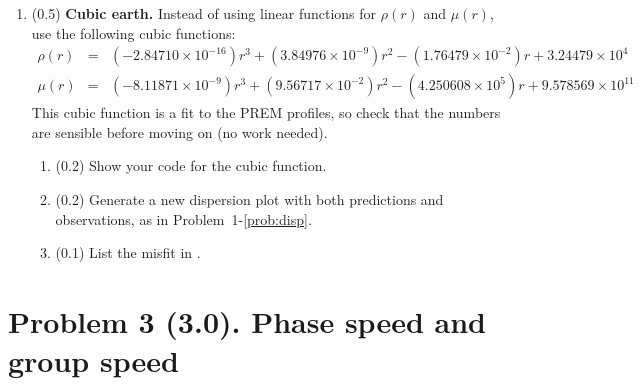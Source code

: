 \documentclass[11pt,titlepage,fleqn]{article}
\begin{document}
\begin{enumerate}
\item (0.5) {\bf Cubic earth.} Instead of using linear functions for $\rho(r)$ and $\mu(r)$, use the following cubic functions:
%
\begin{eqnarray*}
\rho(r) &=& (-2.84710 \times 10^{-16})r^3 + (3.84976 \times 10^{-9})r^2 - (1.76479 \times 10^{-2})r + 3.24479 \times 10^{4}
\\
\mu(r) &=& (-8.11871 \times 10^{-9}) r^3 + (9.56717 \times 10^{-2})r^2 - (4.250608 \times 10^{5})r + 9.578569 \times 10^{11}
\end{eqnarray*}
%
%
This cubic function is a fit to the PREM profiles, so check that the numbers are sensible before moving on (no work needed).

\begin{enumerate}
\item (0.2) Show your code for the cubic function.
\item (0.2) Generate a new dispersion plot with both predictions and observations, as in Problem~1-\ref{prob:disp}.
\item (0.1) List the misfit in .
\end{enumerate}

\label{prob:earth_cubic}

%


\end{enumerate}


\pagebreak
\section*{Problem 3 (3.0). Phase speed and group speed}
\end{document}
